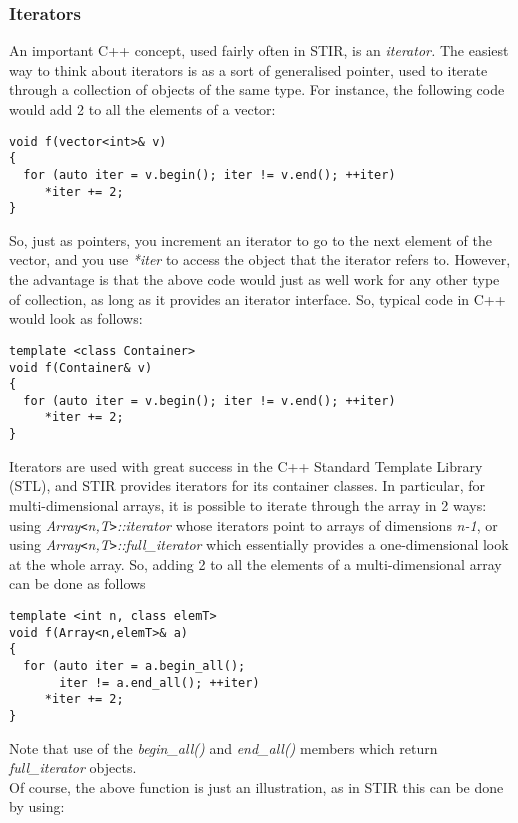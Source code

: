 \documentclass{article}
\begin{document}
\subsubsection{
Iterators}

An important C++ concept, used fairly often in STIR, is an \textit{iterator.} The 
easiest way to think about iterators is as a sort of generalised 
pointer, used to iterate through a collection of objects of the 
same type. For instance, the following code would add 2 to all 
the elements of a vector:

\begin{verbatim}
void f(vector<int>& v)
{
  for (auto iter = v.begin(); iter != v.end(); ++iter)
     *iter += 2;
}
\end{verbatim}


So, just as pointers, you increment an iterator to go to the 
next element of the vector, and you use \textit{*iter} to access the 
object that the iterator refers to. However, the advantage is 
that the above code would just as well work for any other type 
of collection, as long as it provides an iterator interface. 
So, typical code in C++ would look as follows:

\begin{verbatim}
template <class Container>
void f(Container& v)
{
  for (auto iter = v.begin(); iter != v.end(); ++iter)
     *iter += 2;
}
\end{verbatim}


Iterators are used with great success in the C++ Standard Template 
Library (STL), and STIR provides iterators for its container 
classes. In particular, for multi-dimensional arrays, it is possible 
to iterate through the array in 2 ways: using \textit{Array\texttt{<}n,T\texttt{>}::iterator} 
whose iterators point to arrays of dimensions \textit{n-1}, or using \textit{Array\texttt{<}n,T\texttt{>}::full\_iterator} which 
essentially provides a one-dimensional look at the whole array. 
So, adding 2 to all the elements of a multi-dimensional array 
can be done as follows

\begin{verbatim}
template <int n, class elemT>
void f(Array<n,elemT>& a)
{
  for (auto iter = a.begin_all(); 
       iter != a.end_all(); ++iter)
     *iter += 2;
}
\end{verbatim}

Note that use of the \textit{begin\_all()} and \textit{end\_all()} members 
which return \textit{full\_iterator} objects. \\
Of course, the above function is just an illustration, as in 
STIR this can be done by using:
\end{document}
